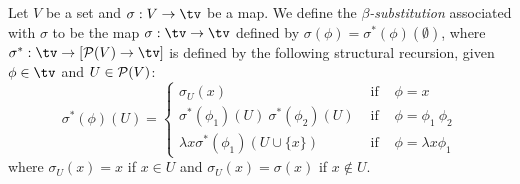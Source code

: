 \begin{defin}\label{logic:def:LAM:subst}
Let $V$ be  a set and $\sigma :V\to \tv$ be a map. We define the
{\em $\beta$-substitution} associated with
$\sigma$ to be the map $\sigma:\tv\to\tv$ defined by
$\sigma(\phi)=\sigma^{*}(\phi)(\emptyset)$, where
$\sigma^{*}:\tv\to[{\cal P}(V)\to\tv]$ is defined by the following structural
recursion, given $\phi\in\tv$ and $U\in{\cal P}(V)$:
    \begin{equation}\label{logic:eqn:LAM:subst:1}
                    \sigma^{*}(\phi)(U)=\left\{
                    \begin{array}{lcl}
                    \sigma_{U}(x)&\mbox{\ if\ }&\phi=x\\
                    \sigma^{*}(\phi_{1})(U)\ \sigma^{*}(\phi_{2})(U)
                    &\mbox{\ if\ }&\phi=\phi_{1}\ \phi_{2}\\
                    \lambda x\sigma^{*}(\phi_{1})(U\cup\{x\})&
                    \mbox{\ if\ }&\phi=\lambda x\phi_{1}
                    \end{array}\right.
    \end{equation}
where $\sigma_{U}(x)=x$ if $x\in U$ and
$\sigma_{U}(x)=\sigma(x)$ if $x\not\in U$.
\end{defin}


